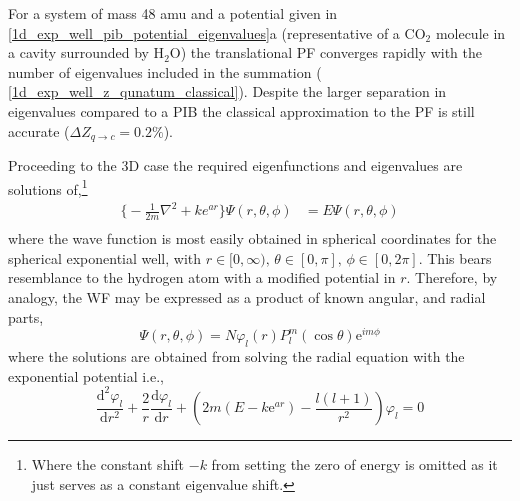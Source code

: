 \documentclass[../main.tex]{subfiles}
\begin{document}
For a system of mass 48 amu and a potential given in \figurename{ \ref{1d_exp_well_pib_potential_eigenvalues}a} (representative of a CO$_2$ molecule in a cavity surrounded by H$_2$O) the translational PF converges rapidly with the number of eigenvalues included in the summation (\figurename{ \ref{1d_exp_well_z_qunatum_classical}}). Despite the larger separation in eigenvalues compared to a PIB the classical approximation to the PF is still accurate ($\Delta Z_{q\rightarrow c} = 0.2\%$).

Proceeding to the 3D case the required eigenfunctions and eigenvalues are solutions of,\footnote{Where the constant shift $-k$ from setting the zero of energy is omitted as it just serves as a constant eigenvalue shift.}
\begin{equation}
\begin{aligned}
{\Big \{} -\frac{1}{2m} \nabla^2 + k e^{ar} {\Big \}}\Psi(r, \theta, \phi) &= E\Psi(r, \theta, \phi) \\ 
\end{aligned}
\label{3d_exp_well_SE}
\end{equation}
where the wave function is most easily obtained in spherical coordinates for the spherical exponential well, with $r \in [0, \infty),\,\theta \in [0, \pi],\,\phi \in [0, 2\pi]$. This bears resemblance to the hydrogen atom with a modified potential in $r$. Therefore, by analogy, the WF may be expressed as a product of known angular, and radial parts,
\begin{equation}
\Psi(r, \theta, \phi) = N \varphi_{l}(r) P_l^m(\cos\theta) \text{e}^{im\phi} 
\end{equation}
where the solutions are obtained from solving the radial equation with the exponential potential i.e.,
\begin{equation}
\frac{\text{d}^2\varphi_l}{\text{d} r^2} + \frac{2}{r} \frac{\text{d}\varphi_l}{\text{d}r} + \left(2m\left(E - k\text{e}^{ar}\right) - \frac{l(l+1)}{r^2}\right)\varphi_l = 0
\label{3d_exp_well_radial}
\end{equation}
\end{document}
